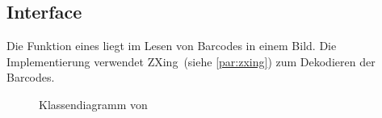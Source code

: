 \subsection*{Interface }
Die Funktion eines  liegt im Lesen von Barcodes in einem Bild.
Die Implementierung  verwendet ZXing~(siehe \autoref{par:zxing}) zum Dekodieren der Barcodes.


\begin{figure}[h]
  \centering
  \caption{Klassendiagramm von }
\end{figure}


